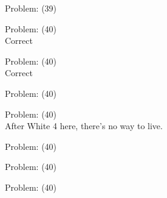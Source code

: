 \documentclass[11pt]{article}
\begin{document}
\begin{minipage}[t]{0.5\textwidth}
  {\centering
  
  Problem: (39)\\
  
  }
\end{minipage}
\begin{minipage}[t]{0.5\textwidth}
  {\centering
  
  Problem: (40)\\
  Correct\\
  }
\end{minipage}
\begin{minipage}[t]{0.5\textwidth}
  {\centering
  
  Problem: (40)\\
  Correct\\
  }
\end{minipage}
\begin{minipage}[t]{0.5\textwidth}
  {\centering
  
  Problem: (40)\\
  
  }
\end{minipage}
\begin{minipage}[t]{0.5\textwidth}
  {\centering
  
  Problem: (40)\\
  After White 4 here, there's no way to live.\\
  }
\end{minipage}
\begin{minipage}[t]{0.5\textwidth}
  {\centering
  
  Problem: (40)\\
  
  }
\end{minipage}
\begin{minipage}[t]{0.5\textwidth}
  {\centering
  
  Problem: (40)\\
  
  }
\end{minipage}
\begin{minipage}[t]{0.5\textwidth}
  {\centering
  
  Problem: (40)\\
  
  }
\end{minipage}
\end{document}
